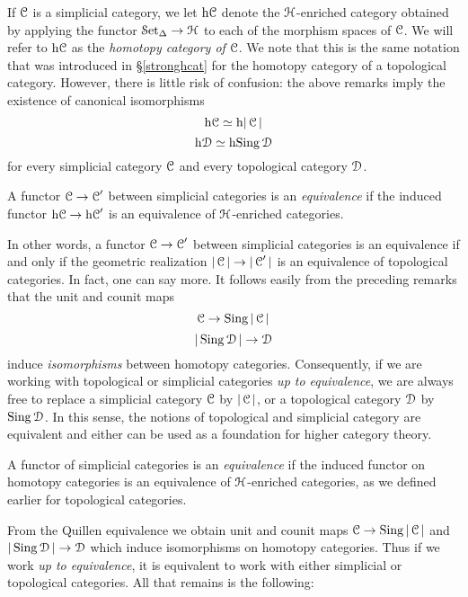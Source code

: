\begin{1.1.4 Simplicial Categories}
If $\operatorname{\mathcal{C}}$ is a simplicial category, we let $\rm{h} \it{\operatorname{\mathcal{C}}}$ denote the $\operatorname{\mathcal{H}}$-enriched category obtained by  applying the functor $\operatorname{\mathcal{S}et_{\Delta}} \rightarrow \operatorname{\mathcal{H}}$ to each of the morphism spaces of $\operatorname{\mathcal{C}}$. We will refer to $\rm{h} \it{ \operatorname{\mathcal{C}}}$ as the {\it homotopy category of $\operatorname{\mathcal{C}}$}. We note that this is the same notation that was introduced in \S \ref{stronghcat} for the homotopy category of a topological category. However, there is little risk of confusion: the above remarks imply the existence of canonical isomorphisms
$$ \rm{h} \it{\operatorname{\mathcal{C}}} \simeq \rm{h} \it{ |\operatorname{\mathcal{C}}|}$$
$$ \rm{h} \it{\operatorname{\mathcal{D}}} \simeq \rm{h} \it{ \operatorname{Sing}\operatorname{\mathcal{D}}}$$
for every simplicial category $\operatorname{\mathcal{C}}$ and every topological category $\operatorname{\mathcal{D}}$.

\begin{definition}
A functor $\operatorname{\mathcal{C}} \rightarrow \operatorname{\mathcal{C}}'$ between simplicial categories is an {\it equivalence} if
the induced functor $\rm{h} \it{ \operatorname{\mathcal{C}}} \rightarrow \rm{h} \it{ \operatorname{\mathcal{C}}'}$ is an equivalence of $\operatorname{\mathcal{H}}$-enriched categories.
\end{definition}

In other words, a functor $\operatorname{\mathcal{C}} \rightarrow \operatorname{\mathcal{C}}'$ between simplicial categories is an equivalence if and only if the geometric realization $|\operatorname{\mathcal{C}}| \rightarrow |\operatorname{\mathcal{C}}'|$ is an equivalence of topological categories. In fact, one can say more. It follows easily from the preceding remarks that the unit and counit maps
$$ \operatorname{\mathcal{C}} \rightarrow \operatorname{Sing} | \operatorname{\mathcal{C}} |$$
$$ | \operatorname{Sing} \operatorname{\mathcal{D}} | \rightarrow \operatorname{\mathcal{D}}$$
induce {\em isomorphisms} between homotopy categories. Consequently, if we are working with topological or simplicial categories {\it up to equivalence}, we are always free to replace a simplicial category $\operatorname{\mathcal{C}}$ by $|\operatorname{\mathcal{C}}|$, or a topological category $\operatorname{\mathcal{D}}$ by $\operatorname{Sing} \operatorname{\mathcal{D}}$. In this sense, the notions of topological and simplicial category are equivalent and either can be used as a foundation for higher category theory.
\begin{shaded}
A functor of simplicial categories is an \textit{equivalence} if the induced functor on homotopy categories is an equivalence of $\operatorname{\mathcal{H}}$-enriched categories, as we defined earlier for topological categories.

From the Quillen equivalence \smash{$\Adjoint{}{\sSet}{\CG}{}$} we obtain unit and counit maps $ \operatorname{\mathcal{C}} \rightarrow \operatorname{Sing} | \operatorname{\mathcal{C}} |$ and $ | \operatorname{Sing} \operatorname{\mathcal{D}} | \rightarrow \operatorname{\mathcal{D}}$ which induce isomorphisms on homotopy categories. Thus if we work \textit{up to equivalence}, it is equivalent to work with either simplicial or topological categories. All that remains is the following:
\end{shaded}
\end{1.1.4 Simplicial Categories}
